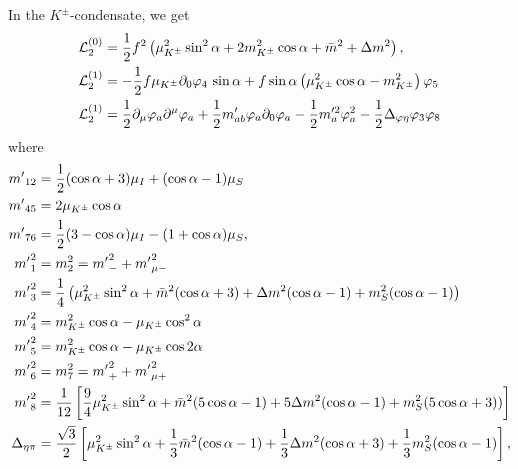 In the $K^\pm$-condensate, we get
%
\begin{align}
    \label{static three-flavor Lagrangian kaon condensate}
    \mathcal{L}^{(0)}_2 
    & =
    \frac{1}{2}f^2 
    \left(
        \mu_{K^\pm}^2 \sin^2\alpha
        + 2m^2_{K^\pm} \cos\alpha
        + \bar m^2 +\Delta m^2
    \right), \\
    \label{linear three-flavor Lagrangian kaon condensate}
    \mathcal{L}_2^{(1)}
    & 
    =
    - \frac{1}{2}f\mu_{K^\pm}\partial_0\varphi_4 \, \sin\alpha 
    + f\sin\alpha
    \left(
        \mu_{K^\pm}^2 \cos\alpha
        -m_{K^\pm}^2
    \right)\varphi_5\\
    \label{quadratic three-flavor Lagrangian kaon condensate}
    \mathcal{L}_2^{(1)}
    & =
    \frac{1}{2} \partial_\mu \varphi_a \partial^\mu \varphi_a
    + \frac{1}{2}m'_{ab} \varphi_a\partial_0\varphi_a
    - \frac{1}{2}m'^2_{a} \varphi_a^2
    - \frac{1}{2}\Delta_{\varphi\eta} \varphi_3\varphi_8
\end{align}
%
where
%
\begingroup
\allowdisplaybreaks
\begin{align}
    {m'}_{12} &= \frac{1}{2}(\cos\alpha + 3)\mu_I + (\cos\alpha - 1)\mu_S \\
    {m'}_{45} &= 2\mu_{K^\pm}\cos\alpha \\
    {m'}_{76} &= \frac{1}{2}(3-\cos\alpha) \mu_I - (1 + \cos\alpha)\mu_S, \\
    {m'}_1^2 & = m_2^2 = {m'}_-^2 + {m'}_{\mu-}^2\\
    {m'}_3^2 
    & = 
    \frac{1}{4}
    \left(
        \mu_{K^\pm}^2 \sin^2\alpha
        + \bar m^2(\cos\alpha + 3)
        + \Delta m^2 (\cos\alpha -1)
        + m_S^2(\cos\alpha - 1)
    \right)\\
    {m'}_4^2 & = m_{K^\pm}^2\cos\alpha -\mu_{K^\pm} \cos^2\alpha \\
    {m'}_5^2 & = m_{K^\pm}^2\cos\alpha -\mu_{K^\pm} \cos 2\alpha \\
    {m'}_6^2 & = m_7^2 = {m'}_+^2 + {m'}_{\mu+}^2\\
    {m'}_8^2
    & =
    \frac{1}{12}
    \left[
        \frac{9}{4}\mu_{K^\pm}^2\sin^2\alpha
        + \bar m^2(5\cos\alpha-1) 
        + 5\Delta m^2(\cos\alpha-1)
        + m_S^2(5\cos\alpha+3))
    \right] \\
    \Delta_{\eta\pi}
    & =
    \frac{\sqrt{3}}{2}
    \left[
        \mu_{K^\pm}^2\sin^2\alpha
        + \frac{1}{3}\bar m^2(\cos\alpha - 1)
        + \frac{1}{3}\Delta m^2(\cos\alpha + 3)
        + \frac{1}{3}m^2_S(\cos\alpha - 1)
    \right],
\end{align}
